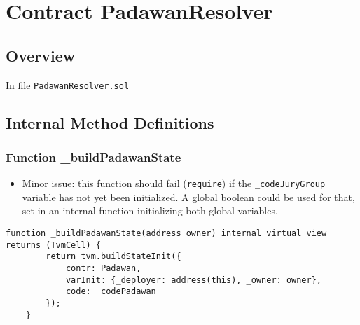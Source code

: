 
\chapter{Contract PadawanResolver}

\minitoc

\section{Overview}


In file {\tt PadawanResolver.sol}

\section{Internal Method Definitions}


\subsection{Function \_{}buildPadawanState}

\begin{itemize}
\item Minor issue: this function should fail ({\tt require}) if the
  {\tt \_codeJuryGroup} variable has not yet been initialized. A global
  boolean could be used for that, set in an internal function
  initializing both global variables.
\end{itemize}

\begin{lstlisting}[firstnumber=16]
    function _buildPadawanState(address owner) internal virtual view returns (TvmCell) {
        return tvm.buildStateInit({
            contr: Padawan,
            varInit: {_deployer: address(this), _owner: owner},
            code: _codePadawan
        });
    }
\end{lstlisting}
